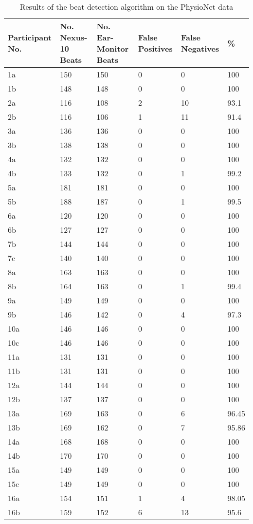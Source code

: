 \begin{table}[H]
\caption{Results of the beat detection algorithm on the PhysioNet data}
\label{tab:BeatDetectionTest}
\centering
\begin{tabular}{|P{1.9cm}| P{1.9cm}| P{1.9cm} | P{1.9cm} | P{1.9cm} | P{1.9cm} |} 
\hline
Participant No.	&	 No. Nexus-10 Beats	&	No. Ear-Monitor Beats	&	False Positives & False Negatives & \%\\ 
\hline
1a	&	150	&	150	&	0	&	0	&	100	\\
\hline
1b	&	148	&	148	&	0	&	0	&	100	\\
\hline
2a	&	116	&	108	&	2	&	10	&	93.1	\\
\hline
2b	&	116	&	106	&	1	&	11	&	91.4	\\
\hline
3a	&	136	&	136	&	0	&	0	&	100	\\
\hline
3b	&	138	&	138	&	0	&	0	&	100	\\
\hline
4a	&	132	&	132	&	0	&	0	&	100	\\
\hline
4b	&	133	&	132	&	0	&	1	&	99.2	\\
\hline
5a	&	181	&	181	&	0	&	0	&	100	\\
\hline
5b	&	188	&	187	&	0	&	1	&	99.5	\\
\hline
6a	&	120	&	120	&	0	&	0	&	100	\\
\hline
6b	&	127	&	127	&	0	&	0	&	100	\\
\hline
7b	&	144	&	144	&	0	&	0	&	100	\\
\hline
7c	&	140	&	140	&	0	&	0	&	100	\\
\hline
8a	&	163	&	163	&	0	&	0	&	100	\\
\hline
8b	&	164	&	163	&	0	&	1	&	99.4	\\
\hline
9a	&	149	&	149	&	0	&	0	&	100	\\
\hline
9b	&	146	&	142	&	0	&	4	&	97.3	\\
\hline
10a	&	146	&	146	&	0	&	0	&	100	\\
\hline
10c	&	146	&	146	&	0	&	0	&	100	\\
\hline
11a	&	131	&	131	&	0	&	0	&	100	\\
\hline
11b	&	131	&	131	&	0	&	0	&	100	\\
\hline
12a	&	144	&	144	&	0	&	0	&	100	\\
\hline
12b	&	137	&	137	&	0	&	0	&	100	\\
\hline
13a	&	169	&	163	&	0	&	6	&	96.45	\\
\hline
13b	&	169	&	162	&	0	&	7	&	95.86	\\
\hline
14a	&	168	&	168	&	0	&	0	&	100	\\
\hline
14b	&	170	&	170	&	0	&	0	&	100	\\
\hline
15a	&	149	&	149	&	0	&	0	&	100	\\
\hline
15c	&	149	&	149	&	0	&	0	&	100	\\
\hline
16a	&	154	&	151	&	1	&	4	&	98.05	\\
\hline
16b	&	159	&	152	&	6	&	13	&	95.6	\\
\hline
\end{tabular}
\end{table}


